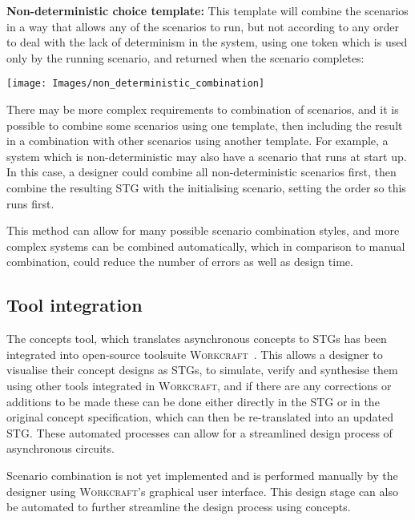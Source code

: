\documentclass[british, journal]{IEEEtran}
\newcommand{\noun}[1]{\textsc{#1}}
\begin{document}
\textbf{Non-deterministic choice template:} This template will combine the
scenarios in a way that allows any of the scenarios to run, but not
according to any order to deal with the lack of determinism in the
system, using one token which is used only by the running scenario,
and returned when the scenario completes:

\vspace{2mm}
\begin{center}
\texttt{[image: Images/non\_deterministic\_combination]}
\end{center}

There may be more complex requirements to combination of scenarios, and it
is possible to combine some scenarios using one template, then including
the result in a combination with other scenarios using another template.
For example, a system which is non-deterministic may also have a scenario
that runs at start up. In this case, a designer could combine all
non-deterministic scenarios first, then combine the resulting STG with
the initialising scenario, setting the order so this runs first.

This method can allow for many possible scenario combination
styles, and more complex systems can be combined automatically, which
in comparison to manual combination, could reduce the number of errors
as well as design time.

\subsection{Tool integration}

The concepts tool, which translates asynchronous concepts to STGs has been
integrated into open-source toolsuite \noun{Workcraft}~\cite{Workcraft_website}.
This allows a designer to visualise their concept designs as STGs, to simulate,
verify and synthesise them using other tools integrated in \noun{Workcraft},
and if there are any corrections or additions to be made these can be done either
directly in the STG or in the original concept specification, which can then
be re-translated into an updated STG. These automated processes can allow for a streamlined design process of asynchronous circuits.

Scenario combination is not yet implemented and is performed manually by
the designer using \noun{Workcraft}'s graphical user interface. This
design stage can also be automated to further streamline the design process
using concepts.
\end{document}
